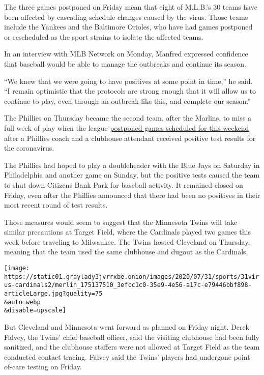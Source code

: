 The three games postponed on Friday mean that eight of M.L.B.'s 30 teams
have been affected by cascading schedule changes caused by the virus.
Those teams include the Yankees and the Baltimore Orioles, who have had
games postponed or rescheduled as the sport strains to isolate the
affected teams.

In an interview with MLB Network on Monday, Manfred expressed confidence
that baseball would be able to manage the outbreaks and continue its
season.

``We knew that we were going to have positives at some point in time,''
he said. ``I remain optimistic that the protocols are strong enough that
it will allow us to continue to play, even through an outbreak like
this, and complete our season.''

The Phillies on Thursday became the second team, after the Marlins, to
miss a full week of play when the league
\href{https://www.nytimes3xbfgragh.onion/2020/07/30/sports/baseball/phillies-blue-jays-postponed-coronavirus.html}{postponed
games scheduled for this weekend} after a Phillies coach and a clubhouse
attendant received positive test results for the coronavirus.

The Phillies had hoped to play a doubleheader with the Blue Jays on
Saturday in Philadelphia and another game on Sunday, but the positive
tests caused the team to shut down Citizens Bank Park for baseball
activity. It remained closed on Friday, even after the Phillies
announced that there had been no positives in their most recent round of
test results.

Those measures would seem to suggest that the Minnesota Twins will take
similar precautions at Target Field, where the Cardinals played two
games this week before traveling to Milwaukee. The Twins hosted
Cleveland on Thursday, meaning that the team used the same clubhouse and
dugout as the Cardinals.

\texttt{[image: https://static01.graylady3jvrrxbe.onion/images/2020/07/31/sports/31virus-cardinals2/merlin\_175137510\_3efcc1c0-35e9-4e56-a17c-e79446bbf898-articleLarge.jpg?quality=75\\\&auto=webp\\\&disable=upscale]}

But Cleveland and Minnesota went forward as planned on Friday night.
Derek Falvey, the Twins' chief baseball officer, said the visiting
clubhouse had been fully sanitized, and the clubhouse staffers were not
allowed at Target Field as the team conducted contact tracing. Falvey
said the Twins' players had undergone point-of-care testing on Friday.

